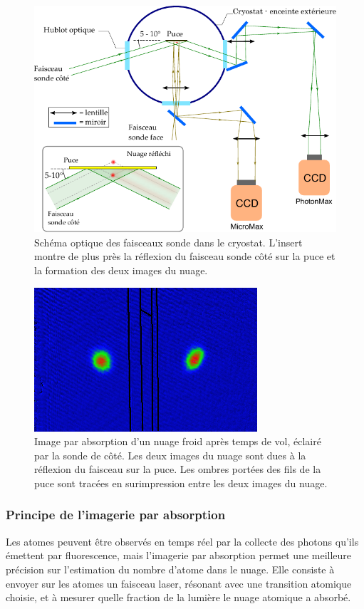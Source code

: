 \begin{figure}[h]
\centering
\includegraphics[width=.7\linewidth]{figures/setup/coldatoms/probes_CdF}
\caption[Faisceaux sonde]{Schéma optique des faisceaux sonde dans le cryostat.
L'insert montre de plus près la réflexion du faisceau sonde côté sur la puce et la formation des deux images du nuage.
}
\label{fig:probes_CdF}
\end{figure}

\begin{figure}[h]
\centering
\includegraphics[width=.6\linewidth]{figures/setup/coldatoms/double_cloud_withWires}
\caption[Image par absorption du nuage par la sonde côté]{Image par absorption d'un nuage froid après temps de vol, éclairé par la sonde de côté. Les deux images du nuage sont dues à la réflexion du faisceau sur la puce.
Les ombres portées des fils de la puce sont tracées en surimpression entre les deux images du nuage.
}
\label{fig:double_cloud}
\end{figure}

\subsubsection*{Principe de l'imagerie par absorption}
\noindent Les atomes peuvent être observés en temps réel par la collecte des photons qu'ils émettent par fluorescence, mais l'imagerie par absorption permet une meilleure précision sur l'estimation du nombre d'atome dans le nuage.
Elle consiste à envoyer sur les atomes un faisceau laser, résonant avec une transition atomique choisie, et à mesurer quelle fraction de la lumière le nuage atomique a absorbé.

